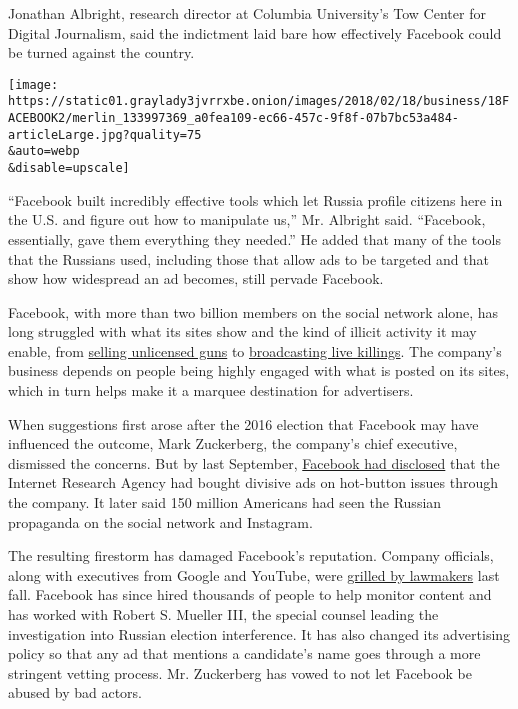Jonathan Albright, research director at Columbia University's Tow Center
for Digital Journalism, said the indictment laid bare how effectively
Facebook could be turned against the country.

\texttt{[image: https://static01.graylady3jvrrxbe.onion/images/2018/02/18/business/18FACEBOOK2/merlin\_133997369\_a0fea109-ec66-457c-9f8f-07b7bc53a484-articleLarge.jpg?quality=75\\\&auto=webp\\\&disable=upscale]}

``Facebook built incredibly effective tools which let Russia profile
citizens here in the U.S. and figure out how to manipulate us,'' Mr.
Albright said. ``Facebook, essentially, gave them everything they
needed.'' He added that many of the tools that the Russians used,
including those that allow ads to be targeted and that show how
widespread an ad becomes, still pervade Facebook.

Facebook, with more than two billion members on the social network
alone, has long struggled with what its sites show and the kind of
illicit activity it may enable, from
\href{https://www.nytimes3xbfgragh.onion/2016/01/30/technology/facebook-gun-sales-ban.html}{selling
unlicensed guns} to
\href{https://www.nytimes3xbfgragh.onion/2017/04/25/world/asia/thailand-phuket-facebook-killing-daughter.html}{broadcasting
live killings}. The company's business depends on people being highly
engaged with what is posted on its sites, which in turn helps make it a
marquee destination for advertisers.

When suggestions first arose after the 2016 election that Facebook may
have influenced the outcome, Mark Zuckerberg, the company's chief
executive, dismissed the concerns. But by last September,
\href{https://www.nytimes3xbfgragh.onion/2017/09/06/technology/facebook-russian-political-ads.html}{Facebook
had disclosed} that the Internet Research Agency had bought divisive ads
on hot-button issues through the company. It later said 150 million
Americans had seen the Russian propaganda on the social network and
Instagram.

The resulting firestorm has damaged Facebook's reputation. Company
officials, along with executives from Google and YouTube, were
\href{https://www.nytimes3xbfgragh.onion/2017/10/31/us/politics/facebook-twitter-google-hearings-congress.html}{grilled
by lawmakers} last fall. Facebook has since hired thousands of people to
help monitor content and has worked with Robert S. Mueller III, the
special counsel leading the investigation into Russian election
interference. It has also changed its advertising policy so that any ad
that mentions a candidate's name goes through a more stringent vetting
process. Mr. Zuckerberg has vowed to not let Facebook be abused by bad
actors.


